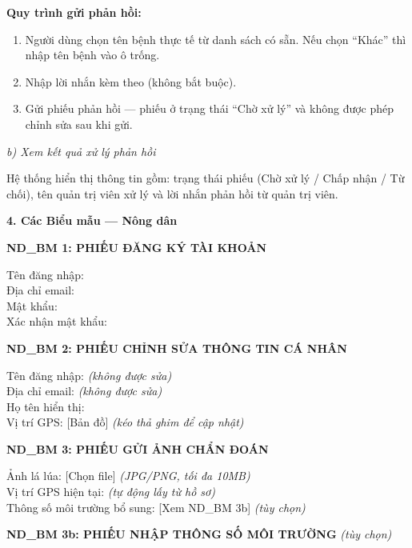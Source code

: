 ﻿\documentclass[12pt,a4paper]{article}
\begin{document}
\noindent\textbf{Quy trình gửi phản hồi:}
\begin{enumerate}
    \item Người dùng chọn tên bệnh thực tế từ danh sách có sẵn. Nếu chọn ``Khác'' thì nhập tên bệnh vào ô trống.
    \item Nhập lời nhắn kèm theo (không bắt buộc).
    \item Gửi phiếu phản hồi --- phiếu ở trạng thái ``Chờ xử lý'' và không được phép chỉnh sửa sau khi gửi.
\end{enumerate}

\noindent\textit{b) Xem kết quả xử lý phản hồi}

Hệ thống hiển thị thông tin gồm: trạng thái phiếu (Chờ xử lý / Chấp nhận / Từ chối), tên quản trị viên xử lý và lời nhắn phản hồi từ quản trị viên.

\vspace{0.3cm}
\textbf{4. Các Biểu mẫu --- Nông dân}

\vspace{0.3cm}
\noindent\textbf{ND\_BM 1: PHIẾU ĐĂNG KÝ TÀI KHOẢN}

\noindent Tên đăng nhập: \dotfill \\
Địa chỉ email: \dotfill \\
Mật khẩu: \dotfill \\
Xác nhận mật khẩu: \dotfill

\vspace{0.3cm}
\noindent\textbf{ND\_BM 2: PHIẾU CHỈNH SỬA THÔNG TIN CÁ NHÂN}

\noindent Tên đăng nhập: \dotfill \textit{(không được sửa)} \\
Địa chỉ email: \dotfill \textit{(không được sửa)} \\
Họ tên hiển thị: \dotfill \\
Vị trí GPS: [Bản đồ] \textit{(kéo thả ghim để cập nhật)}

\vspace{0.3cm}
\noindent\textbf{ND\_BM 3: PHIẾU GỬI ẢNH CHẨN ĐOÁN}

\noindent Ảnh lá lúa: [Chọn file] \textit{(JPG/PNG, tối đa 10MB)} \\
Vị trí GPS hiện tại: \dotfill \textit{(tự động lấy từ hồ sơ)} \\
Thông số môi trường bổ sung: [Xem ND\_BM 3b] \textit{(tùy chọn)}

\vspace{0.2cm}
\noindent\textbf{ND\_BM 3b: PHIẾU NHẬP THÔNG SỐ MÔI TRƯỜNG} \textit{(tùy chọn)}
\end{document}
